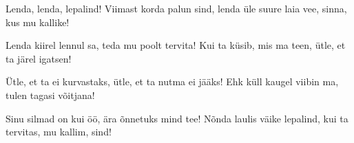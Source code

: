 Lenda, lenda, lepalind!
Viimast korda palun sind,
lenda \"ule suure laia vee,
sinna, kus mu kallike!

Lenda kiirel lennul sa,
teda mu poolt tervita!
Kui ta k\"usib, mis ma teen,
\"utle, et ta j\"arel igatsen!

\"Utle, et ta ei kurvastaks,
\"utle, et ta nutma ei j\"a\"aks!
Ehk k\"ull kaugel viibin ma,
tulen tagasi v\~oitjana!

Sinu silmad on kui \"o\"o,
\"ara \~onnetuks mind tee!
N\~onda laulis v\"aike lepalind,
kui ta tervitas, mu kallim, sind!